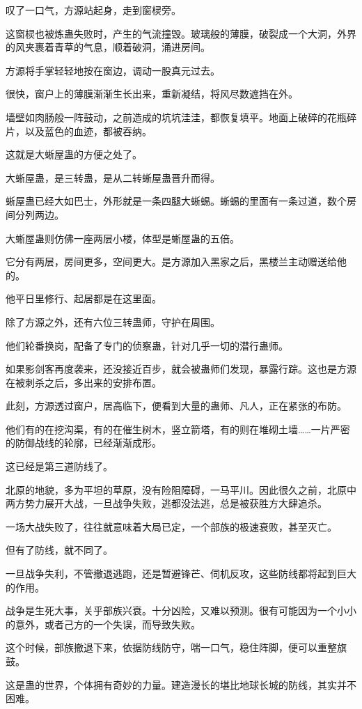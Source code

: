 \begin{this_body}
叹了一口气，方源站起身，走到窗棂旁。

这窗棂也被炼蛊失败时，产生的气流撞毁。玻璃般的薄膜，破裂成一个大洞，外界的风夹裹着青草的气息，顺着破洞，涌进房间。

方源将手掌轻轻地按在窗边，调动一股真元过去。

很快，窗户上的薄膜渐渐生长出来，重新凝结，将风尽数遮挡在外。

墙壁如肉肠般一阵鼓动，之前造成的坑坑洼洼，都恢复填平。地面上破碎的花瓶碎片，以及蓝色的血迹，都被吞纳。

这就是大蜥屋蛊的方便之处了。

大蜥屋蛊，是三转蛊，是从二转蜥屋蛊晋升而得。

蜥屋蛊已经大如巴士，外形就是一条四腿大蜥蜴。蜥蜴的里面有一条过道，数个房间分列两边。

大蜥屋蛊则仿佛一座两层小楼，体型是蜥屋蛊的五倍。

它分有两层，房间更多，空间更大。是方源加入黑家之后，黑楼兰主动赠送给他的。

他平日里修行、起居都是在这里面。

除了方源之外，还有六位三转蛊师，守护在周围。

他们轮番换岗，配备了专门的侦察蛊，针对几乎一切的潜行蛊师。

如果影剑客再度袭来，还没接近百步，就会被蛊师们发现，暴露行踪。这也是方源在被刺杀之后，多出来的安排布置。

此刻，方源透过窗户，居高临下，便看到大量的蛊师、凡人，正在紧张的布防。

他们有的在挖沟渠，有的在催生树木，竖立箭塔，有的则在堆砌土墙……一片严密的防御战线的轮廓，已经渐渐成形。

这已经是第三道防线了。

北原的地貌，多为平坦的草原，没有险阻障碍，一马平川。因此很久之前，北原中两方势力展开大战，一旦战争失败，逃都没法逃，总是被获胜方大肆追杀。

一场大战失败了，往往就意味着大局已定，一个部族的极速衰败，甚至灭亡。

但有了防线，就不同了。

一旦战争失利，不管撤退逃跑，还是暂避锋芒、伺机反攻，这些防线都将起到巨大的作用。

战争是生死大事，关乎部族兴衰。十分凶险，又难以预测。很有可能因为一个小小的意外，或者己方的一个失误，而导致失败。

这个时候，部族撤退下来，依据防线防守，喘一口气，稳住阵脚，便可以重整旗鼓。

这是蛊的世界，个体拥有奇妙的力量。建造漫长的堪比地球长城的防线，其实并不困难。


\end{this_body}
